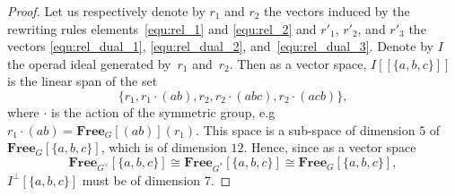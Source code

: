 \documentclass[a4paper]{article}
\theoremstyle{definition}
\newcommand{\FreeOp}{\mathbf{Free}}
\begin{document}
\begin{proof}
Let us respectively denote by $r_1$ and $r_2$ the vectors induced by the rewriting rules
elements~\eqref{equ:rel_1} and \eqref{equ:rel_2} and $r'_1$, $r'_2$, and $r'_3$ the vectors 
\eqref{equ:rel_dual_1}, \eqref{equ:rel_dual_2}, and~\eqref{equ:rel_dual_3}. Denote by $I$ 
the operad ideal generated by~$r_1$ and~$r_2$. Then as a vector space, $I[[\{a,b,c\}]]$ 
is the linear span of the set
\begin{equation}
    \{r_1, r_1 \cdot (ab), r_2,r_2 \cdot (abc), r_2 \cdot (acb)\},
\end{equation}
where $\cdot$ is the action of the symmetric group, e.g $r_1\cdot (ab) = \FreeOp_{G}[(ab)](r_1)$. 
This space is a sub-space of dimension $5$ of $\FreeOp_G[\{a,b,c\}]$, which is
of dimension $12$. Hence, since as a vector space
\begin{equation}
	\FreeOp_{G^\vee}[\{a,b,c\}]
	\cong \FreeOp_{G^*}[\{a,b,c\}]\cong
	\FreeOp_{G}[\{a,b,c\}],
\end{equation}
$I^{\bot}[\{a,b,c\}]$ must be of dimension 7.


\end{proof}
\end{document}
